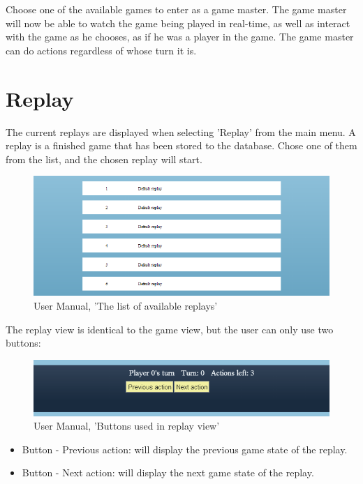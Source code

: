 \noindent Choose one of the available games to enter as a game master. The game master will now be able to watch the game being played in real-time, as well as interact with the game as he chooses, as if he was a player in the game. The game master can do actions regardless of whose turn it is.

\section{Replay}

The current replays are displayed when selecting 'Replay' from the main menu. A replay is a finished game that has been stored to the database. Chose one of them from the list, and the chosen replay will start.

\begin{figure}[H]
  \centering
    \includegraphics[width=1.0\textwidth]{img/replays.png}
  \caption{User Manual, 'The list of available replays'}
  \label{fig:replaylist}
\end{figure}

The replay view is identical to the game view, but the user can only use two buttons:

\begin{figure}[H]
  \centering
    \includegraphics[width=1.0\textwidth]{img/replaybuttons.png}
  \caption{User Manual, 'Buttons used in replay view'}
  \label{fig:replaylist}
\end{figure}

\begin{itemize}
\item Button - Previous action: will display the previous game state of the replay.
\item Button - Next action: will display the next game state of the replay.
\end{itemize}

